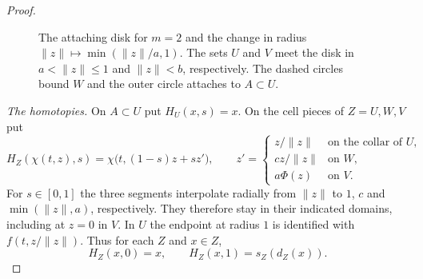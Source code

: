 \documentclass[12pt,a4paper]{amsart}
\theoremstyle{definition}
\renewcommand{\leq}{\leqslant}
\begin{document}
\begin{proof}
\begin{figure}[htbp]
\centering
{}
\caption{The attaching disk for $m=2$ and the change in radius $\|z\|\mapsto\min(\|z\|/a,1)$. The sets $U$ and $V$ meet the disk in $a<\|z\|\leq1$ and $\|z\|<b$, respectively. The dashed circles bound $W$ and the outer circle attaches to $A\subset U$.}\label{fig:reversible-collar}
\end{figure}

\emph{The homotopies.} On $A\subset U$ put $H_U(x,s)=x$. On the cell pieces of $Z=U,W,V$ put
\[
 H_Z(\chi(t,z),s)=\chi\bigl(t,(1-s)z+s z'\bigr),\qquad
 z'=\begin{cases}
 z/\|z\| & \text{on the collar of }U,\\
 cz/\|z\| & \text{on }W,\\
 a\Phi(z) & \text{on }V .
 \end{cases}
\]
For $s\in[0,1]$ the three segments interpolate radially from $\|z\|$ to $1$, $c$ and $\min(\|z\|,a)$, respectively. They therefore stay in their indicated domains, including at $z=0$ in $V$. In $U$ the endpoint at radius $1$ is identified with $f(t,z/\|z\|)$. Thus for each $Z$ and $x\in Z$,
\[
 H_Z(x,0)=x,\qquad H_Z(x,1)=s_Z(d_Z(x)).
\]


\end{proof}
\end{document}
